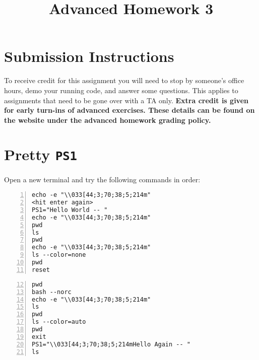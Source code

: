 \documentclass{article}
\begin{document}
\fancyfoot[C]{\color{gray} \thepage~/~\pageref*{LastPage}}
\pagestyle{fancyplain}

\title{\textbf{Advanced Homework 3\\}}
\author{\textbf{\color{red}{Due: Wednesday, October 3rd, 11:59PM (Hard Deadline)}}}
\date{}
\maketitle


\section*{Submission Instructions}
To receive credit for this assignment you will need to stop by someone's
office hours, demo your running code, and answer some questions. \textbf{\color{red}{Make sure
to check the office hour schedule as the real due date is at the last office
hours before the date listed above.}} This applies to assignments that need to be gone over with a TA only.
\textbf{Extra credit is given for early turn-ins of advanced exercises. These details can be found on the website under the advanced homework grading policy.}


\section{Pretty \texttt{PS1}}

Open a new terminal and try the following commands in order:

\begin{minipage}[t]{0.5\textwidth}
\begin{lstlisting}[numbers=left]
echo -e "\\033[44;3;70;38;5;214m"
<hit enter again>
PS1="Hello World -- "
echo -e "\\033[44;3;70;38;5;214m"
pwd
ls
pwd
echo -e "\\033[44;3;70;38;5;214m"
ls --color=none
pwd
reset
\end{lstlisting}
\end{minipage}
\begin{minipage}[t]{0.5\textwidth}
  \begin{lstlisting}[numbers=left,firstnumber=12]
pwd
bash --norc
echo -e "\\033[44;3;70;38;5;214m"
ls
pwd
ls --color=auto
pwd
exit
PS1="\\033[44;3;70;38;5;214mHello Again -- "
ls
\end{lstlisting}
\end{minipage}
\end{document}
